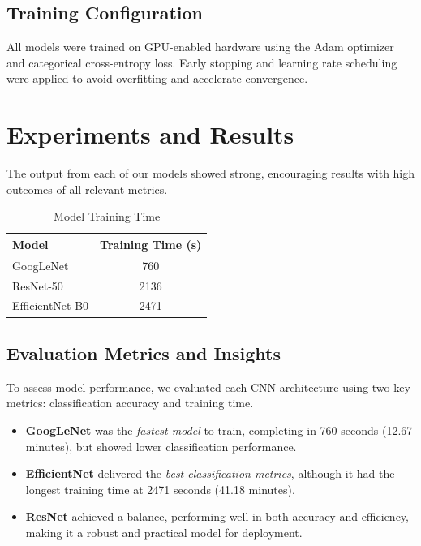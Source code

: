 \documentclass[11pt,twocolumn]{article}
\begin{document}
\subsection{Training Configuration}
All models were trained on GPU-enabled hardware using the Adam optimizer and categorical cross-entropy loss. Early stopping and learning rate scheduling were applied to avoid overfitting and accelerate convergence.




\section{Experiments and Results}
\label{sec:experiments}

The output from each of our models showed strong, encouraging results with high outcomes of all relevant metrics. 


\begin{table}[h]
\centering
\caption{Model Training Time}


\begin{tabular}{lc}
\hline
\textbf{Model} & \textbf{Training Time (s)} \\
\hline

GoogLeNet & 760 \\
ResNet-50 & 2136 \\
EfficientNet-B0 & 2471 \\

\hline
\end{tabular}
\label{tab:training_time}
\end{table}

\subsection{Evaluation Metrics and Insights}
\label{sec:evaluation}

To assess model performance, we evaluated each CNN architecture using two key metrics: classification accuracy and training time.

\begin{itemize}
    \item \textbf{GoogLeNet} was the \textit{fastest model} to train, completing in 760 seconds (12.67 minutes), but showed lower classification performance.
    \item \textbf{EfficientNet} delivered the \textit{best classification metrics}, although it had the longest training time at 2471 seconds (41.18 minutes).
    \item \textbf{ResNet} achieved a balance, performing well in both accuracy and efficiency, making it a robust and practical model for deployment.
\end{itemize}
\end{document}
